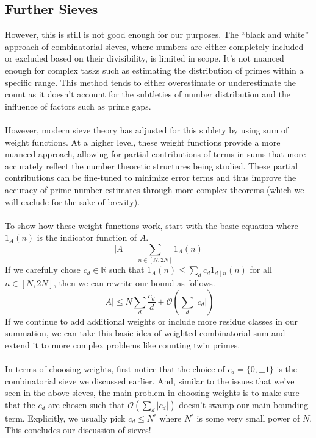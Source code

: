 \documentclass[10pt]{extarticle}
\begin{document}
\subsection{Further Sieves} 
However, this is still is not good enough for our purposes. The ``black and white'' approach of combinatorial sieves, where numbers are either completely included or excluded based on their divisibility, is limited in scope. 
It's not nuanced enough for complex tasks such as estimating the distribution of primes within a specific range. 
This method tends to either overestimate or underestimate the count as it doesn't account for the subtleties of number distribution and the influence of factors such as prime gaps. \\
\\
However, modern sieve theory has adjusted for this sublety by using sum of weight functions. 
At a higher level, these weight functions provide a more nuanced approach, allowing for partial contributions of terms in sums that more accurately reflect the number theoretic structures being studied. 
These partial contributions can be fine-tuned to minimize error terms and thus improve the accuracy of prime number estimates through more complex theorems (which we will exclude for the sake of brevity). \\
\\
To show how these weight functions work, start with the basic equation where $1_A(n)$ is the indicator function of $A$.
$$
|A| = \sum_{n \in [N,2N]} 1_A(n)
$$
If we carefully chose $c_d \in \mathbb{R}$ such that $1_A(n) \leq \sum_{d} c_d 1_{d \mid n} (n)$ for all $n \in [N,2N]$, then we can rewrite our bound as follows.
$$
|A| \leq N \sum_{d} \frac{c_d}{d} + \mathcal{O}\left(\sum_{d} |c_d| \right)
$$
If we continue to add additional weights or include more residue classes in our summation, we can take this basic idea of weighted combinatorial sum and extend it to more complex problems like counting twin primes.\\
\\
In terms of choosing weights, first notice that the choice of $c_d = \{0,\pm 1\}$ is the combinatorial sieve we discussed earlier. 
And, similar to the issues that we've seen in the above sieves, the main problem in choosing weights is to make sure that the $c_d$ are chosen such that $\mathcal{O}\left(\sum_{d} |c_d|\right)$ doesn't swamp our main bounding term. Explicitly, we usually pick $c_d \leq N^\epsilon$ where $N^\epsilon$ is some very small power of $N$. This concludes our discussion of sieves!
\end{document}
